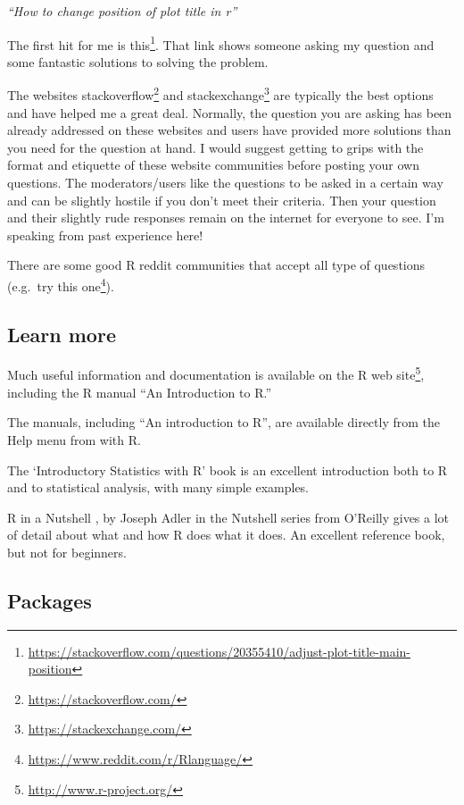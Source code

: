\documentclass[
]{book}
\makeatletter
\renewcommand{\href}[2]{#2\footnote{\url{#1}}}
\newenvironment{kframe}{%
\medskip{}
\setlength{\fboxsep}{.8em}
 \def\at@end@of@kframe{}%
 \ifinner\ifhmode%
  \def\at@end@of@kframe{\end{minipage}}%
  \begin{minipage}{\columnwidth}%
 \fi\fi%
 \def\FrameCommand##1{\hskip\@totalleftmargin \hskip-\fboxsep
 \colorbox{shadecolor}{##1}\hskip-\fboxsep
     \hskip-\linewidth \hskip-\@totalleftmargin \hskip\columnwidth}%
 \MakeFramed {\advance\hsize-\width
   \@totalleftmargin\z@ \linewidth\hsize
   \@setminipage}}%
 {\par\unskip\endMakeFramed%
 \at@end@of@kframe}
\newenvironment{rmdblock}[1]
  {
  \begin{itemize}
  \renewcommand{\labelitemi}{
    \raisebox{-.7\height}[0pt][0pt]{
      {\setkeys{Gin}{width=3em,keepaspectratio}\texttt{[image: images/\#1]}}
    }
  }
  \setlength{\fboxsep}{1em}
  \begin{kframe}
  \item
  }
  {
  \end{kframe}
  \end{itemize}
  }
\newenvironment{rmdnote}
  {\begin{rmdblock}{note}}
  {\end{rmdblock}}
\makeatother
\begin{document}
\emph{``How to change position of plot title in r''}

The first hit for me is \href{https://stackoverflow.com/questions/20355410/adjust-plot-title-main-position}{this}. That link shows someone asking my question and some fantastic solutions to solving the problem.

The websites \href{https://stackoverflow.com/}{stackoverflow} and \href{https://stackexchange.com/}{stackexchange} are typically the best options and have helped me a great deal. Normally, the question you are asking has been already addressed on these websites and users have provided more solutions than you need for the question at hand. I would suggest getting to grips with the format and etiquette of these website communities before posting your own questions. The moderators/users like the questions to be asked in a certain way and can be slightly hostile if you don't meet their criteria. Then your question and their slightly rude responses remain on the internet for everyone to see. I'm speaking from past experience here!

There are some good R reddit communities that accept all type of questions (e.g.~\href{https://www.reddit.com/r/Rlanguage/}{try this one}).

\hypertarget{learn-more}{%
\subsection{Learn more}\label{learn-more}}

Much useful information and documentation is available on the \href{http://www.r-project.org/}{R web site}, including the R manual ``An Introduction to R.''

\begin{rmdnote}
The manuals, including ``An introduction to R'', are available directly from the Help menu from with R.
\end{rmdnote}

The `Introductory Statistics with R' book \citep{dalgaard_introductory_2008} is an excellent introduction both to R and to statistical analysis, with many simple examples.

R in a Nutshell \citep{adler_r_2010}, by Joseph Adler in the Nutshell series from O'Reilly gives a lot of detail about what and how R does what it does. An excellent reference book, but not for beginners.

\hypertarget{packages}{%
\subsection{Packages}\label{packages}}
\end{document}

